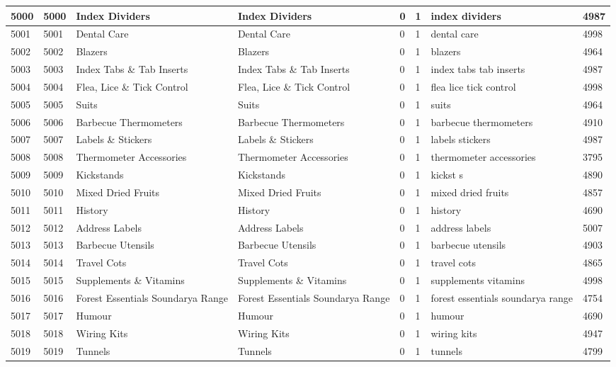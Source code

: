 \begin{longtable}{|l|l|l|l|l|l|l|l|}
5000 & 5000 & Index Dividers & Index Dividers & 0 & 1 & index dividers & 4987 \\ \hline 
5001 & 5001 & Dental Care & Dental Care & 0 & 1 & dental care & 4998 \\ \hline 
5002 & 5002 & Blazers & Blazers & 0 & 1 & blazers & 4964 \\ \hline 
5003 & 5003 & Index Tabs \& Tab Inserts & Index Tabs \& Tab Inserts & 0 & 1 & index tabs tab inserts & 4987 \\ \hline 
5004 & 5004 & Flea, Lice \& Tick Control & Flea, Lice \& Tick Control & 0 & 1 & flea lice tick control & 4998 \\ \hline 
5005 & 5005 & Suits & Suits & 0 & 1 & suits & 4964 \\ \hline 
5006 & 5006 & Barbecue Thermometers & Barbecue Thermometers & 0 & 1 & barbecue thermometers & 4910 \\ \hline 
5007 & 5007 & Labels \& Stickers & Labels \& Stickers & 0 & 1 & labels stickers & 4987 \\ \hline 
5008 & 5008 & Thermometer Accessories & Thermometer Accessories & 0 & 1 & thermometer accessories & 3795 \\ \hline 
5009 & 5009 & Kickstands & Kickstands & 0 & 1 & kickst s & 4890 \\ \hline 
5010 & 5010 & Mixed Dried Fruits & Mixed Dried Fruits & 0 & 1 & mixed dried fruits & 4857 \\ \hline 
5011 & 5011 & History & History & 0 & 1 & history & 4690 \\ \hline 
5012 & 5012 & Address Labels & Address Labels & 0 & 1 & address labels & 5007 \\ \hline 
5013 & 5013 & Barbecue Utensils & Barbecue Utensils & 0 & 1 & barbecue utensils & 4903 \\ \hline 
5014 & 5014 & Travel Cots & Travel Cots & 0 & 1 & travel cots & 4865 \\ \hline 
5015 & 5015 & Supplements \& Vitamins & Supplements \& Vitamins & 0 & 1 & supplements vitamins & 4998 \\ \hline 
5016 & 5016 & Forest Essentials Soundarya Range & Forest Essentials Soundarya Range & 0 & 1 & forest essentials soundarya range & 4754 \\ \hline 
5017 & 5017 & Humour & Humour & 0 & 1 & humour & 4690 \\ \hline 
5018 & 5018 & Wiring Kits & Wiring Kits & 0 & 1 & wiring kits & 4947 \\ \hline 
5019 & 5019 & Tunnels & Tunnels & 0 & 1 & tunnels & 4799 \\ \hline 

\end{longtable}

